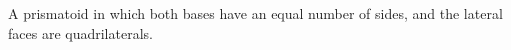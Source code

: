 A prismatoid in which both bases have an equal number of sides, and
the lateral faces are quadrilaterals.